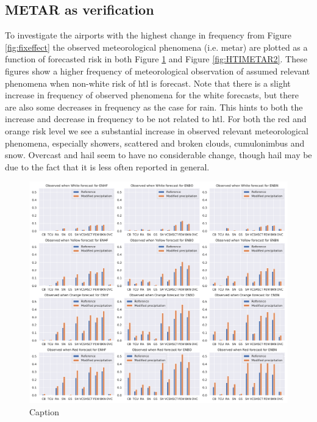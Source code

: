 \subsection{METAR as verification}
To investigate the airports with the highest change in frequency from Figure \ref{fig:fixeffect} the observed meteorological phenomena (i.e. \acrshort{metar}) are plotted as a function of forecasted risk in both Figure \ref{fig:HTIMETAR1} and Figure \ref{fig:HTIMETAR2}. These figures show a higher frequency of meteorological observation of assumed relevant phenomena when non-white risk of \acrshort{htl} is forecast. Note that there is a slight increase in frequency of observed phenomena for the white forecasts, but there are also some decreases in frequency as the case for rain. This hints to both the increase and decrease in frequency to be not related to \acrshort{htl}. For both the red and orange risk level we see a substantial increase in observed relevant meteorological phenomena, especially showers, scattered and broken clouds, cumulonimbus and snow. Overcast and hail seem to have no considerable change, though hail may be due to the fact that it is less often reported in general.

\begin{figure}
    \centering
    \includegraphics[width=\textwidth]{Figures/HTIMetar1.pdf}
    \caption{Caption}
    \label{fig:HTIMETAR1}
\end{figure}

